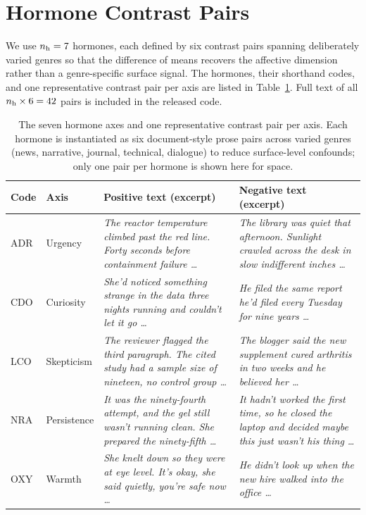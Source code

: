 \section{Hormone Contrast Pairs}
\label{app:contrast-pairs}

We use $n_{\text{h}} = 7$ hormones, each defined by six contrast pairs spanning deliberately varied genres so that the difference of means recovers the affective dimension rather than a genre-specific surface signal. The hormones, their shorthand codes, and one representative contrast pair per axis are listed in Table~\ref{tab:contrast-examples}. Full text of all $n_{\text{h}} \times 6 = 42$ pairs is included in the released code.

\begin{table}[h]
\centering
\caption{The seven hormone axes and one representative contrast pair per axis. Each hormone is instantiated as six document-style prose pairs across varied genres (news, narrative, journal, technical, dialogue) to reduce surface-level confounds; only one pair per hormone is shown here for space.}
\label{tab:contrast-examples}
\small
\begin{tabular}{llp{3.6cm}p{3.6cm}}
\toprule
Code & Axis & Positive text (excerpt) & Negative text (excerpt) \\
\midrule
ADR  & Urgency        & \textit{The reactor temperature climbed past the red line. Forty seconds before containment failure \ldots} & \textit{The library was quiet that afternoon. Sunlight crawled across the desk in slow indifferent inches \ldots} \\[4pt]
CDO  & Curiosity      & \textit{She'd noticed something strange in the data three nights running and couldn't let it go \ldots} & \textit{He filed the same report he'd filed every Tuesday for nine years \ldots} \\[4pt]
LCO  & Skepticism     & \textit{The reviewer flagged the third paragraph. The cited study had a sample size of nineteen, no control group \ldots} & \textit{The blogger said the new supplement cured arthritis in two weeks and he believed her \ldots} \\[4pt]
NRA  & Persistence    & \textit{It was the ninety-fourth attempt, and the gel still wasn't running clean. She prepared the ninety-fifth \ldots} & \textit{It hadn't worked the first time, so he closed the laptop and decided maybe this just wasn't his thing \ldots} \\[4pt]
OXY  & Warmth         & \textit{She knelt down so they were at eye level. It's okay, she said quietly, you're safe now \ldots} & \textit{He didn't look up when the new hire walked into the office \ldots} \\[4pt]

\end{tabular}
\end{table}
